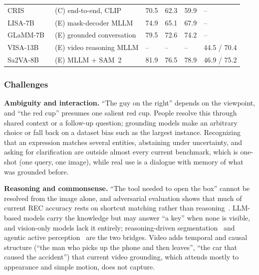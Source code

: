 \begin{table}[!ht]
\begin{tabular}{L{0.26\textwidth} L{0.22\textwidth} C{0.10\textwidth} C{0.10\textwidth} C{0.10\textwidth} C{0.10\textwidth}}
    \midrule
    CRIS~\cite{wang2022cris}                 & (C) end-to-end, CLIP       & 70.5 & 62.3 & 59.9 & -- \\
    LISA-7B~\cite{lai2024lisa}               & (E) mask-decoder MLLM      & 74.9 & 65.1 & 67.9 & -- \\
    GLaMM-7B~\cite{rasheed2024glamm}         & (E) grounded conversation  & 79.5 & 72.6 & 74.2 & -- \\
    VISA-13B~\cite{yan2024visa}              & (E) video reasoning MLLM   & --   & --   & --   & 44.5 / 70.4 \\
    Sa2VA-8B~\cite{yuan2025sa2va}            & (E) MLLM + SAM~2           & 81.9 & 76.5 & 78.9 & 46.9 / 75.2 \\
    \bottomrule
    \end{tabular}
\end{table}

\subsubsection{Challenges}

\textbf{Ambiguity and interaction.} ``The guy on the right'' depends on the viewpoint, and ``the red cup'' presumes one salient red cup. People resolve this through shared context or a follow-up question; grounding models make an arbitrary choice or fall back on a dataset bias such as the largest instance. Recognizing that an expression matches several entities, abstaining under uncertainty, and asking for clarification are outside almost every current benchmark, which is one-shot (one query, one image), while real use is a dialogue with memory of what was grounded before.

\textbf{Reasoning and commonsense.} ``The tool needed to open the box'' cannot be resolved from the image alone, and adversarial evaluation shows that much of current REC accuracy rests on shortcut matching rather than reasoning~\cite{dong2026ref}. LLM-based models carry the knowledge but may answer ``a key'' when none is visible, and vision-only models lack it entirely; reasoning-driven segmentation~\cite{lai2024lisa} and agentic active perception~\cite{zheng2025deepeyes} are the two bridges. Video adds temporal and causal structure (``the man who picks up the phone and then leaves'', ``the car that caused the accident'') that current video grounding, which attends mostly to appearance and simple motion, does not capture.

